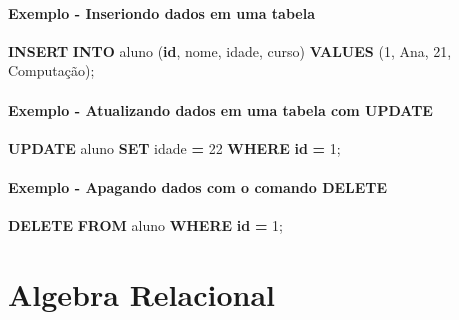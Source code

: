 \documentclass[
]{book}
\newenvironment{Shaded}{\begin{snugshade}}{\end{snugshade}}
\newcommand{\DecValTok}[1]{\textcolor[rgb]{0.00,0.00,0.81}{#1}}
\newcommand{\KeywordTok}[1]{\textcolor[rgb]{0.13,0.29,0.53}{\textbf{#1}}}
\newcommand{\NormalTok}[1]{#1}
\newcommand{\OperatorTok}[1]{\textcolor[rgb]{0.81,0.36,0.00}{\textbf{#1}}}
\newcommand{\StringTok}[1]{\textcolor[rgb]{0.31,0.60,0.02}{#1}}
\begin{document}
\paragraph{Exemplo - Inseriondo dados em uma tabela}\label{exemplo---inseriondo-dados-em-uma-tabela}

\begin{Shaded}
\begin{Highlighting}[]
\KeywordTok{INSERT} \KeywordTok{INTO}\NormalTok{ aluno (}\KeywordTok{id}\NormalTok{, nome, idade, curso) }\KeywordTok{VALUES}\NormalTok{ (}\DecValTok{1}\NormalTok{, }\StringTok{\textquotesingle{}Ana\textquotesingle{}}\NormalTok{, }\DecValTok{21}\NormalTok{, }\StringTok{\textquotesingle{}Computação\textquotesingle{}}\NormalTok{);}
\end{Highlighting}
\end{Shaded}

\paragraph{Exemplo - Atualizando dados em uma tabela com UPDATE}\label{exemplo---atualizando-dados-em-uma-tabela-com-update}

\begin{Shaded}
\begin{Highlighting}[]
\KeywordTok{UPDATE}\NormalTok{ aluno }\KeywordTok{SET}\NormalTok{ idade }\OperatorTok{=} \DecValTok{22} \KeywordTok{WHERE} \KeywordTok{id} \OperatorTok{=} \DecValTok{1}\NormalTok{;}
\end{Highlighting}
\end{Shaded}

\paragraph{Exemplo - Apagando dados com o comando DELETE}\label{exemplo---apagando-dados-com-o-comando-delete}

\begin{Shaded}
\begin{Highlighting}[]
\KeywordTok{DELETE} \KeywordTok{FROM}\NormalTok{ aluno }\KeywordTok{WHERE} \KeywordTok{id} \OperatorTok{=} \DecValTok{1}\NormalTok{;}
\end{Highlighting}
\end{Shaded}

\section{Algebra Relacional}\label{algebra-relacional}
\end{document}
